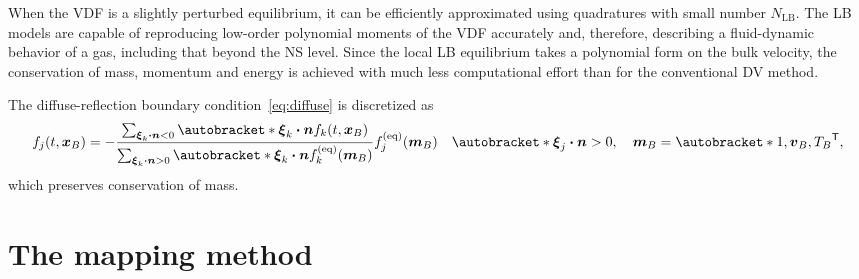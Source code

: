 \documentclass{elsarticle} %
\newcommand{\transpose}[1]{#1^\mathsf{T}}
\DeclarePairedDelimiter\autobracket()       %
\newcommand{\br}[1]{\autobracket*{#1}}
\newcommand{\bxi}{\boldsymbol{\xi}}
\newcommand{\bv}{\boldsymbol{v}}
\newcommand{\bn}{\boldsymbol{n}}
\newcommand{\bm}{\boldsymbol{m}}
\newcommand{\bdot}{\boldsymbol{\cdot}}
\newcommand{\bx}{\boldsymbol{x}}
\newcommand{\equil}[1]{#1^\mathrm{(eq)}}
\newcommand{\LB}{\mathrm{LB}}
\begin{document}
When the VDF is a slightly perturbed equilibrium,
it can be efficiently approximated using quadratures with small number \(N_\LB\).
The LB models are capable of reproducing low-order polynomial moments of the VDF accurately and,
therefore, describing a fluid-dynamic behavior of a gas, including that beyond the NS level.
Since the local LB equilibrium takes a polynomial form on the bulk velocity,
the conservation of mass, momentum and energy is achieved
with much less computational effort than for the conventional DV method.


The diffuse-reflection boundary condition~\eqref{eq:diffuse} is discretized as
\begin{equation}\label{eq:diffuse-dv}
    f_j(t,\bx_B) = -\frac{\sum_{\bxi_k\bdot\bn<0} \br{ \bxi_k\bdot\bn } f_k(t,\bx_B)}
        {\sum_{\bxi_k\bdot\bn>0} \br{ \bxi_k\bdot\bn } \equil{f}_k(\bm_B)}
        \equil{f}_j(\bm_B) \quad \br{ \bxi_j\bdot\bn>0 }, \quad \bm_B = \transpose{\br{1, \bv_B, T_B}},
\end{equation}
which preserves conservation of mass.

\section{The mapping method}\label{sec:mapping}
\end{document}
